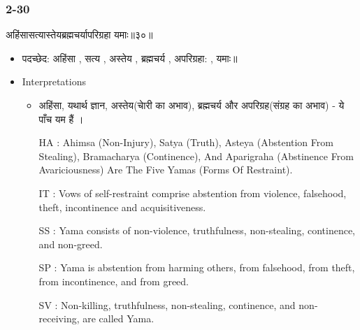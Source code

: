 \begin{frame}[fragile]\frametitle{2-30}
\begin{sanskrit}
अहिंसासत्यास्तेयब्रह्मचर्यापरिग्रहा यमाः॥३०॥
\end{sanskrit}

	\begin{itemize}
	\item पदच्छेद: अहिंसा , सत्य , अस्तेय , ब्रह्मचर्य , अपरिग्रहा: , यमाः॥
	\item Interpretations
		\begin{itemize}
		\item अहिंसा, यथार्थ ज्ञान, अस्तेय(चाेरी का अभाव), ब्रह्मचर्य और अपरिग्रह(संग्रह का अभाव) - ये पाँच यम हैं ।
		\item [HA]: Ahimsa (Non-Injury), Satya (Truth), Asteya (Abstention From Stealing), Bramacharya (Continence), And Aparigraha (Abstinence From Avariciousness) Are The Five Yamas (Forms Of Restraint).
		\item [IT]: Vows of self-restraint comprise abstention from violence, falsehood, theft, incontinence and acquisitiveness.
		\item [SS]: Yama consists of non-violence, truthfulness, non-stealing, continence, and non-greed.
		\item [SP]: Yama is abstention from harming others, from falsehood, from theft, from incontinence, and from greed.
		\item [SV]: Non-killing, truthfulness, non-stealing, continence, and non-receiving, are called Yama. 
		\end{itemize}
	\end{itemize}	
\end{frame}


